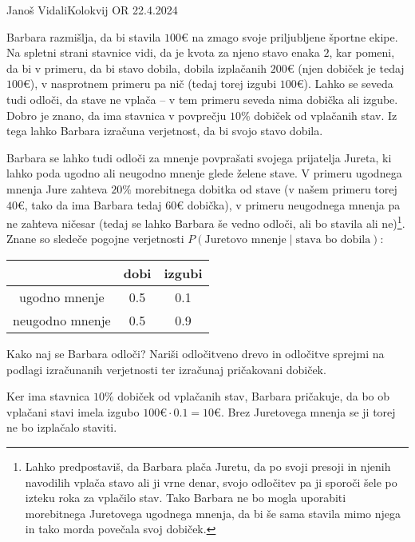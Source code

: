 \begin{naloga}{Janoš Vidali}{Kolokvij OR 22.4.2024}
\begin{vprasanje}
Barbara razmišlja,
da bi stavila $100€$ na zmago svoje priljubljene športne ekipe.
Na spletni strani stavnice vidi, da je kvota za njeno stavo enaka $2$,
kar pomeni, da bi v primeru, da bi stavo dobila, dobila izplačanih $200€$
(njen dobiček je tedaj $100€$),
v nasprotnem primeru pa nič (tedaj torej izgubi $100 €$).
Lahko se seveda tudi odloči, da stave ne vplača
-- v tem primeru seveda nima dobička ali izgube.
Dobro je znano, da ima stavnica v povprečju $10\%$ dobiček od vplačanih stav.
Iz tega lahko Barbara izračuna verjetnost, da bi svojo stavo dobila.

Barbara se lahko tudi odloči za mnenje povprašati svojega prijatelja Jureta,
ki lahko poda ugod\-no ali neugodno mnenje glede želene stave.
V primeru ugodnega mnenja Jure zahteva $20\%$ morebitnega dobitka od stave
(v našem primeru torej $40€$, tako da ima Barbara tedaj $60€$ dobička),
v primeru neugodnega mnenja pa ne zahteva ničesar
(tedaj se lahko Barbara še vedno odloči, ali bo stavila ali ne)\footnote{%
Lahko predpostaviš, da Barbara plača Juretu,
da po svoji presoji in njenih navodilih vplača stavo ali ji vrne denar,
svojo odločitev pa ji sporoči šele po izteku roka za vplačilo stav.
Tako Barbara ne bo mogla uporabiti morebitnega Juretovega ugodnega mnenja,
da bi še sama stavila mimo njega in tako morda povečala svoj dobiček.
}.
Znane so sledeče pogojne verjetnosti
$P(\text{Juretovo mnenje} \mid \text{stava bo dobila})$:
\begin{center}
\begin{tabular}{c|cc}
& dobi & izgubi \\ \hline
ugodno mnenje & 0.5 & 0.1 \\
neugodno mnenje & 0.5 & 0.9
\end{tabular}
\end{center}
Kako naj se Barbara odloči?
Nariši odločitveno drevo in odločitve sprejmi na podlagi izračunanih verjetnosti
ter izračunaj pričakovani dobiček.
\end{vprasanje}

\begin{odgovor}
Ker ima stavnica $10\%$ dobiček od vplačanih stav, Barbara pričakuje,
da bo ob vplačani stavi imela izgubo $100 € \cdot 0.1 = 10 €$.
Brez Juretovega mnenja se ji torej ne bo izplačalo staviti.


\end{odgovor}
\end{naloga}

